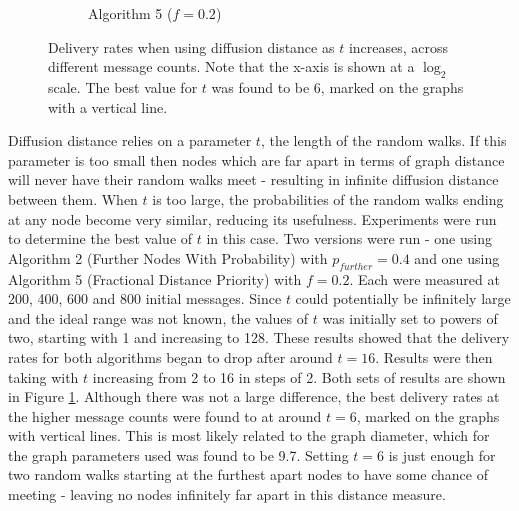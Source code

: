 \documentclass[bsc,frontabs,twoside,singlespacing,parskip,deptreport]{infthesis}     %
\begin{document}
\begin{figure}
\begin{subfigure}[t]{0.49\textwidth}
\caption{Algorithm 5 ($f=0.2$)}
\end{subfigure}
\caption{Delivery rates when using diffusion distance as $t$ increases, across different message counts. Note that the x-axis is shown at a $\log_{2}$ scale. The best value for $t$ was found to be 6, marked on the graphs with a vertical line.}
\label{fig:diffusion_dist_t}
\end{figure}

Diffusion distance relies on a parameter $t$, the length of the random walks. If this parameter is too small then nodes which are far apart in terms of graph distance will never have their random walks meet - resulting in infinite diffusion distance between them. When $t$ is too large, the probabilities of the random walks ending at any node become very similar, reducing its usefulness. Experiments were run to determine the best value of $t$ in this case. Two versions were run - one using Algorithm 2 (Further Nodes With Probability) with $p_{further}=0.4$ and one using Algorithm 5 (Fractional Distance Priority) with $f=0.2$. Each were measured at 200, 400, 600 and 800 initial messages. Since $t$ could potentially be infinitely large and the ideal range was not known, the values of $t$ was initially set to powers of two, starting with 1 and increasing to 128. These results showed that the delivery rates for both algorithms began to drop after around $t=16$. Results were then taking with $t$ increasing from 2 to 16 in steps of 2. Both sets of results are shown in Figure \ref{fig:diffusion_dist_t}. Although there was not a large difference, the best delivery rates at the higher message counts were found to at around $t=6$, marked on the graphs with vertical lines. This is most likely related to the graph diameter, which for the graph parameters used was found to be 9.7. Setting $t=6$ is just enough for two random walks starting at the furthest apart nodes to have some chance of meeting - leaving no nodes infinitely far apart in this distance measure.
\end{document}
